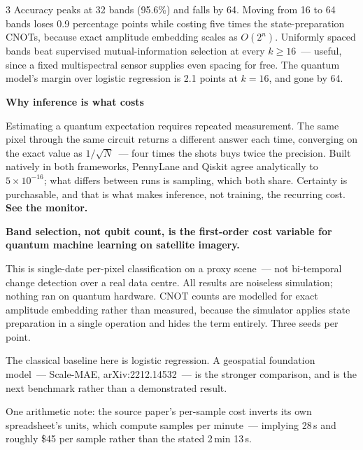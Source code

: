 \documentclass[a0,portrait,final]{a0poster}
\newcommand{\headsize}{\fontsize{48}{58}\selectfont}
\newcommand{\blsize}{\fontsize{54}{66}\selectfont}
\newcommand{\shead}[1]{%
  \par\vspace{16mm}{\headsize\bfseries\color{cq}#1}\par\vspace{6mm}}
\newcommand{\sheadtop}[1]{%
  \par{\headsize\bfseries\color{cq}#1}\par\vspace{6mm}}
\newcommand{\gap}{\par\vspace{7mm}}
\begin{document}
\begin{multicols}{3}
\vspace{5mm}
Accuracy peaks at 32 bands (95.6\%) and falls by 64. Moving from 16 to 64 bands
loses 0.9 percentage points while costing five times the state-preparation
CNOTs, because exact amplitude embedding scales as $O(2^{n})$. Uniformly spaced
bands beat supervised mutual-information selection at every $k \geq 16$~---
useful, since a fixed multispectral sensor supplies even spacing for free. The
quantum model's margin over logistic regression is 2.1 points at $k = 16$, and
gone by 64.

\columnbreak

\sheadtop{Why inference is what costs}

Estimating a quantum expectation requires repeated measurement. The same pixel
through the same circuit returns a different answer each time, converging on the
exact value as $1/\sqrt{N}$~--- four times the shots buys twice the precision.
Built natively in both frameworks, PennyLane and Qiskit agree analytically to
$5\times10^{-16}$; what differs between runs is sampling, which both share.
Certainty is purchasable, and that is what makes inference, not training, the
recurring cost. \textbf{See the monitor.}

\vspace{22mm}
{\blsize\bfseries\color{ink}
Band selection, not qubit count, is the first-order cost variable for quantum
machine learning on satellite imagery.\par}
\vspace{22mm}

\shead{What this does not show}

This is single-date per-pixel classification on a proxy scene~--- not
bi-temporal change detection over a real data centre. All results are noiseless
simulation; nothing ran on quantum hardware. CNOT counts are modelled for exact
amplitude embedding rather than measured, because the simulator applies state
preparation in a single operation and hides the term entirely. Three seeds per
point.
\gap
The classical baseline here is logistic regression. A geospatial foundation
model~--- Scale-MAE, arXiv:2212.14532~--- is the stronger comparison, and is the
next benchmark rather than a demonstrated result.
\gap
One arithmetic note: the source paper's per-sample cost inverts its own
spreadsheet's units, which compute samples per minute~--- implying 28\,s and
roughly \$45 per sample rather than the stated 2\,min 13\,s.


\end{multicols}
\end{document}
